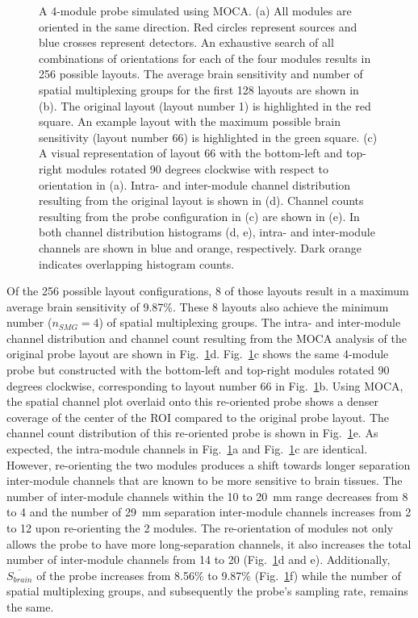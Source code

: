 \begin{figure}
\begin{center}
\end{center}
\caption{A 4-module probe simulated using MOCA. (a) All modules are oriented in the same direction. Red circles represent sources and blue crosses represent detectors. An exhaustive search of all combinations of orientations for each of the four modules results in 256 possible layouts. The average brain sensitivity and number of spatial multiplexing groups for the first 128 layouts are shown in (b). The original layout (layout number 1) is highlighted in the red square. An example layout with the maximum possible brain sensitivity (layout number 66) is highlighted in the green square. (c) A visual representation of layout 66 with the bottom-left and top-right modules rotated 90 degrees clockwise with respect to orientation in (a). Intra- and inter-module channel distribution resulting from the original layout is shown in (d). Channel counts resulting from the probe configuration in (c) are shown in (e). In both channel distribution histograms (d, e), intra- and inter-module channels are shown in blue and orange, respectively. Dark orange indicates overlapping histogram counts.} 
\label{fig:orientation}
\end{figure} 

Of the 256 possible layout configurations, 8 of those layouts result in a maximum average brain sensitivity of 9.87\%. These 8 layouts also achieve the minimum number ($n_{SMG}=4$) of spatial multiplexing groups. The intra- and inter-module channel distribution and channel count resulting from the \ac{MOCA} analysis of the original probe layout are shown in Fig.~\ref{fig:orientation}d. Fig.~\ref{fig:orientation}c shows the same 4-module probe but constructed with the bottom-left and top-right modules rotated 90 degrees clockwise, corresponding to layout number 66 in Fig.~\ref{fig:orientation}b. Using \ac{MOCA}, the spatial channel plot overlaid onto this re-oriented probe shows a denser coverage of the center of the \ac{ROI} compared to the original probe layout. The channel count distribution of this re-oriented probe is shown in Fig.~\ref{fig:orientation}e. As expected, the intra-module channels in Fig.~\ref{fig:orientation}a and Fig.~\ref{fig:orientation}c are identical. However, re-orienting the two modules produces a shift towards longer separation inter-module channels that are known to be more sensitive to brain tissues. The number of inter-module channels within the 10 to 20~mm range decreases from 8 to 4 and the number of 29~mm separation inter-module channels increases from 2 to 12 upon re-orienting the 2 modules. The re-orientation of modules not only allows the probe to have more long-separation channels, it also increases the total number of inter-module channels from 14 to 20 (Fig.~\ref{fig:orientation}d and e). Additionally, $\overline{S_{brain}}$ of the probe increases from 8.56\% to 9.87\% (Fig.~\ref{fig:orientation}f) while the number of spatial multiplexing groups, and subsequently the probe's sampling rate, remains the same.


